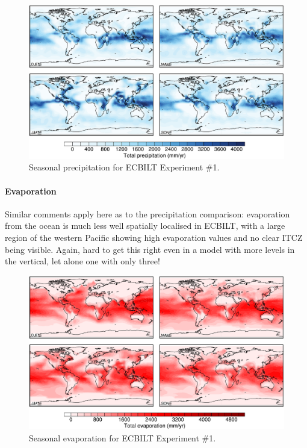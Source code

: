 \documentclass[a4paper,11pt]{article}
\begin{document}
\begin{figure}
  \begin{center}
    \includegraphics[width=\textwidth]{../expt-1/plots/pp-plots}
  \end{center}
  \caption{Seasonal precipitation for ECBILT Experiment \#1.}
  \label{fig:pp-1}
\end{figure}

\paragraph{Evaporation}

Similar comments apply here as to the precipitation comparison:
evaporation from the ocean is much less well spatially localised in
ECBILT, with a large region of the western Pacific showing high
evaporation values and no clear ITCZ being visible.  Again, hard to
get this right even in a model with more levels in the vertical, let
alone one with only three!

\begin{figure}
  \begin{center}
    \includegraphics[width=\textwidth]{../expt-1/plots/evap-plots}
  \end{center}
  \caption{Seasonal evaporation for ECBILT Experiment \#1.}
  \label{fig:evap-1}
\end{figure}
\end{document}

